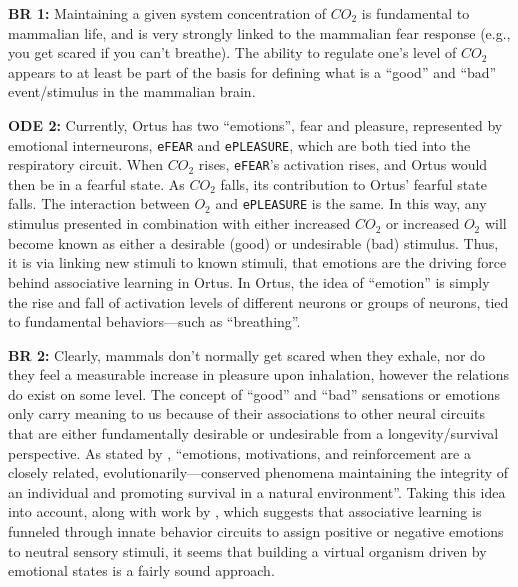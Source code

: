 \documentclass[letterpaper]{article}
\begin{document}
\textbf{BR 1:} Maintaining a given system concentration of $CO_2$ is fundamental to mammalian life, and is very strongly linked to the mammalian fear response (e.g., you get scared if you can't breathe). The ability to regulate one's level of $CO_2$ appears to at least be part of the basis for defining what is a ``good'' and ``bad'' event/stimulus in the mammalian brain.

\textbf{ODE 2:} Currently, Ortus has two ``emotions'', fear and pleasure, represented by emotional interneurons, \texttt{eFEAR} and \texttt{ePLEASURE}, which are both tied into the respiratory circuit. When $CO_2$ rises, \texttt{eFEAR}'s activation rises, and Ortus would then be in a fearful state. As $CO_2$ falls, its contribution to Ortus' fearful state falls. The interaction between $O_2$ and \texttt{ePLEASURE} is the same. In this way, any stimulus presented in combination with either increased $CO_2$ or increased $O_2$ will become known as either a desirable (good) or undesirable (bad) stimulus. Thus, it is via linking new stimuli to known stimuli, that emotions are the driving force behind associative learning in Ortus. In Ortus, the idea of ``emotion'' is simply the rise and fall of activation levels of different neurons or groups of neurons, tied to fundamental behaviors---such as ``breathing''.

\textbf{BR 2:} Clearly, mammals don't normally get scared when they exhale, nor do they feel a measurable increase in pleasure upon inhalation, however the relations do exist on some level. The concept of ``good'' and ``bad'' sensations or emotions only carry meaning to us because of their associations to other neural circuits that are either fundamentally desirable or undesirable from a longevity/survival perspective.
As stated by \citet{Verma2015}, ``emotions, motivations, and reinforcement are a closely related, evolutionarily---conserved phenomena maintaining the integrity of an individual and promoting survival in a natural environment''. Taking this idea into account, along with work by \citet{Gore2015}, which suggests that associative learning is funneled through innate behavior circuits to assign positive or negative emotions to neutral sensory stimuli, it seems that building a virtual organism driven by emotional states is a fairly sound approach. 
\end{document}
